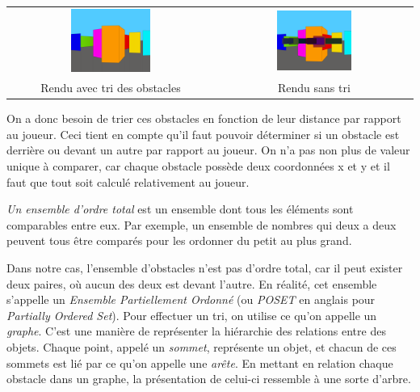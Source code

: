 \documentclass[11pt,french,a4paper,]{article}
\begin{document}
\begin{longtable}[]{@{}cc@{}}
\toprule
\endhead
\includegraphics[width=0.4\textwidth,height=\textheight]{../img/CoverPic/SortedMain.png}
&
\includegraphics[width=0.4\textwidth,height=\textheight]{../img/CoverPic/UnsortedMain.png}\tabularnewline
Rendu avec tri des obstacles & Rendu sans tri\tabularnewline
\bottomrule
\end{longtable}

On a donc besoin de trier ces obstacles en fonction de leur distance par
rapport au joueur. Ceci tient en compte qu'il faut pouvoir déterminer si
un obstacle est derrière ou devant un autre par rapport au joueur. On
n'a pas non plus de valeur unique à comparer, car chaque obstacle
possède deux coordonnées x et y et il faut que tout soit calculé
relativement au joueur.

\emph{Un ensemble d'ordre total} est un ensemble dont tous les éléments
sont comparables entre eux. Par exemple, un ensemble de nombres qui deux
a deux peuvent tous être comparés pour les ordonner du petit au plus
grand.

Dans notre cas, l'ensemble d'obstacles n'est pas d'ordre total, car il
peut exister deux paires, où aucun des deux est devant l'autre. En
réalité, cet ensemble s'appelle un \emph{Ensemble Partiellement Ordonné}
(ou \emph{POSET} en anglais pour \emph{Partially Ordered Set}). Pour
effectuer un tri, on utilise ce qu'on appelle un \emph{graphe}. C'est
une manière de représenter la hiérarchie des relations entre des objets.
Chaque point, appelé un \emph{sommet}, représente un objet, et chacun de
ces sommets est lié par ce qu'on appelle une \emph{arête}. En mettant en
relation chaque obstacle dans un graphe, la présentation de celui-ci
ressemble à une sorte d'arbre.
\end{document}
